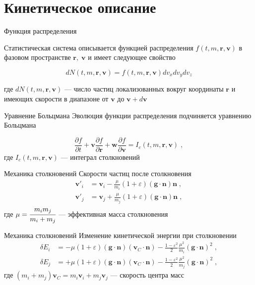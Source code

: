 \documentclass[10pt]{beamer}
\newcommand{\pd}{\partial}
\newcommand{\br}{\bm{r}}
\newcommand{\bv}{\bm{v}}
\newcommand{\bw}{\bm{w}}
\newcommand{\bg}{\bm{g}}
\newcommand{\bn}{\bm{n}}
\begin{document}
\section{Кинетическое описание}

\begin{frame}{Функция распределения}
  
  Статистическая система описывается функцией распределения $f(t,m,\br,\bv)$ в фазовом пространстве $\br,\;\bv$
  и имеет следующее свойство

  \begin{equation}
    dN(t,m,\br,\bv)=f(t,m,\br,\bv)dv_xdv_ydv_z
  \end{equation}

  где $dN(t,m,\br,\bv)$ --- число частиц локализованных вокруг координаты $\br$ и имеющих скорости
  в диапазоне от $\bv$ до $\bv+d\bv$

\end{frame}

\begin{frame}[fragile]{Уравнение Больцмана}
	Эволюция функции распределения подчиняется уравнению Больцмана

  \begin{equation}
    \frac{\pd f}{\pd t}+\bv\frac{\pd f}{\pd\br}+\bw\frac{\pd f}{\pd\bv}=I_c(t,m,\br,\bv)\;,
  \end{equation}
  где $I_c(t,m,\br,\bv)$ --- интеграл столкновений
  
\end{frame}

\begin{frame}[fragile]{Механика столкновений}
  Скорости частиц после столкновения
  \begin{equation}
    \begin{split}
      \bv'_i&=\bv_i-\frac{\mu}{m_i}(1+\varepsilon)(\bg\cdot\bn)\bn\;,\\
      \bv'_j&=\bv_j+\frac{\mu}{m_j}(1+\varepsilon)(\bg\cdot\bn)\bn\;,
    \end{split}
  \end{equation}
  где $\mu=\cfrac{m_im_j}{m_i+m_j}$ --- эффективная масса столкновения
\end{frame}

\begin{frame}[fragile]{Механика столкновений}
  Изменение кинетической энергии при столкновении
  \begin{equation}
    \begin{split}
      \delta E_i&=-\mu(1+\varepsilon)(\bg\cdot\bn)(\bv_C\cdot\bn)-\frac{1-\varepsilon^2}{2}\frac{\mu^2}{m_i}(\bg\cdot\bn)^2\;,\\
      \delta E_j&=+\mu(1+\varepsilon)(\bg\cdot\bn)(\bv_C\cdot\bn)-\frac{1-\varepsilon^2}{2}\frac{\mu^2}{m_j}(\bg\cdot\bn)^2\;,
    \end{split}
  \end{equation}
  где $(m_i+m_j)\bv_C=m_i\bv_i+m_j\bv_j$ --- скорость центра масс
\end{frame}
\end{document}
